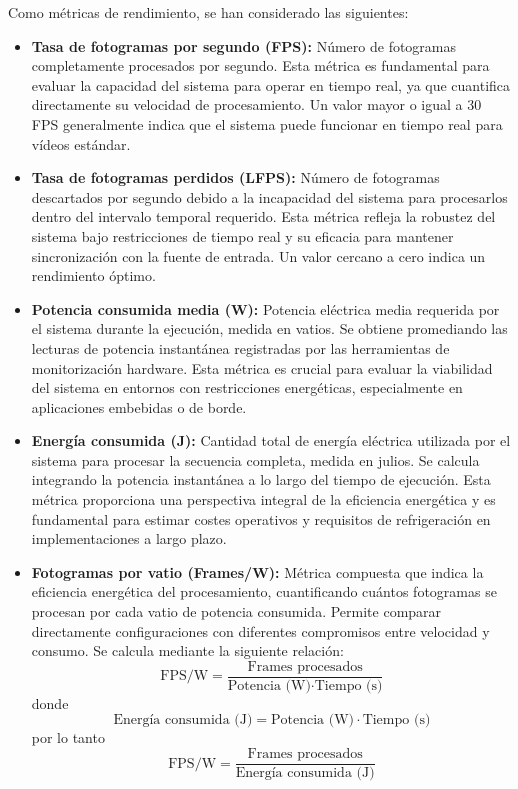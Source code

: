 \documentclass[11pt,spanish,listoffigures,listoftables]{tfgetsinf}
\begin{document}
Como métricas de rendimiento, se han considerado las siguientes:
\begin{itemize}
   \item \textbf{Tasa de fotogramas por segundo (FPS):} Número de fotogramas completamente procesados por segundo. Esta métrica es fundamental para evaluar la capacidad del sistema para operar en tiempo real, ya que cuantifica directamente su velocidad de procesamiento. Un valor mayor o igual a 30 FPS generalmente indica que el sistema puede funcionar en tiempo real para vídeos estándar.

      \item \textbf{Tasa de fotogramas perdidos (LFPS):} Número de fotogramas descartados por segundo debido a la incapacidad del sistema para procesarlos dentro del intervalo temporal requerido. Esta métrica refleja la robustez del sistema bajo restricciones de tiempo real y su eficacia para mantener sincronización con la fuente de entrada. Un valor cercano a cero indica un rendimiento óptimo.

      \item \textbf{Potencia consumida media (W):} Potencia eléctrica media requerida por el sistema durante la ejecución, medida en vatios. Se obtiene promediando las lecturas de potencia instantánea registradas por las herramientas de monitorización hardware. Esta métrica es crucial para evaluar la viabilidad del sistema en entornos con restricciones energéticas, especialmente en aplicaciones embebidas o de borde.

      \item \textbf{Energía consumida (J):} Cantidad total de energía eléctrica utilizada por el sistema para procesar la secuencia completa, medida en julios. Se calcula integrando la potencia instantánea a lo largo del tiempo de ejecución. Esta métrica proporciona una perspectiva integral de la eficiencia energética y es fundamental para estimar costes operativos y requisitos de refrigeración en implementaciones a largo plazo.

      \item \textbf{Fotogramas por vatio (Frames/W):} Métrica compuesta que indica la eficiencia energética del procesamiento, cuantificando cuántos fotogramas se procesan por cada vatio de potencia consumida. Permite comparar directamente configuraciones con diferentes compromisos entre velocidad y consumo. Se calcula mediante la siguiente relación:
      \begin{equation}
         \text{FPS/W} = \frac{\text{Frames procesados}}{\text{Potencia (W)} \cdot \text{Tiempo (s)}}
      \end{equation}
      donde
      \begin{equation}
         \text{Energía consumida (J)} = \text{Potencia (W)} \cdot \text{Tiempo (s)}
      \end{equation}
      por lo tanto
      \begin{equation}
         \text{FPS/W} = \frac{\text{Frames procesados}}{\text{Energía consumida (J)}}
      \end{equation}
      

\end{itemize}
\end{document}
